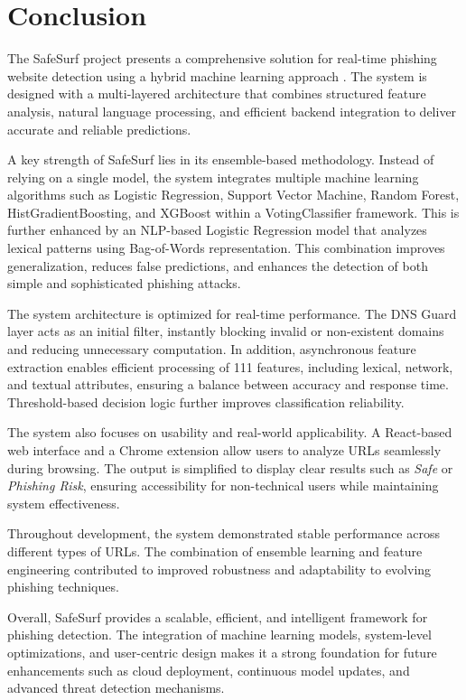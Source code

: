 \chapter{Conclusion}

The SafeSurf project presents a comprehensive solution for real-time phishing website detection using a hybrid machine learning approach \cite{ref1}. The system is designed with a multi-layered architecture that combines structured feature analysis, natural language processing, and efficient backend integration to deliver accurate and reliable predictions.

A key strength of SafeSurf lies in its ensemble-based methodology. Instead of relying on a single model, the system integrates multiple machine learning algorithms such as Logistic Regression, Support Vector Machine, Random Forest, HistGradientBoosting, and XGBoost within a VotingClassifier framework. This is further enhanced by an NLP-based Logistic Regression model that analyzes lexical patterns using Bag-of-Words representation. This combination improves generalization, reduces false predictions, and enhances the detection of both simple and sophisticated phishing attacks.

The system architecture is optimized for real-time performance. The DNS Guard layer acts as an initial filter, instantly blocking invalid or non-existent domains and reducing unnecessary computation. In addition, asynchronous feature extraction enables efficient processing of 111 features, including lexical, network, and textual attributes, ensuring a balance between accuracy and response time. Threshold-based decision logic further improves classification reliability.

The system also focuses on usability and real-world applicability. A React-based web interface and a Chrome extension allow users to analyze URLs seamlessly during browsing. The output is simplified to display clear results such as \textit{Safe} or \textit{Phishing Risk}, ensuring accessibility for non-technical users while maintaining system effectiveness.

Throughout development, the system demonstrated stable performance across different types of URLs. The combination of ensemble learning and feature engineering contributed to improved robustness and adaptability to evolving phishing techniques.

Overall, SafeSurf provides a scalable, efficient, and intelligent framework for phishing detection. The integration of machine learning models, system-level optimizations, and user-centric design makes it a strong foundation for future enhancements such as cloud deployment, continuous model updates, and advanced threat detection mechanisms.